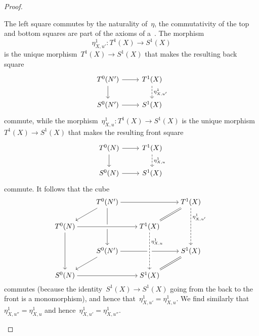 \begin{proof}
\begin{enumerate}
\[      \]
      The left square commutes by the naturality of~$\eta$, the commutativity of the top and bottom squares are part of the axioms of a~{\deltafun}.
      The morphism
      \[
        \eta^1_{X,u'}
        \colon
        T^1(X)
        \to
        S^1(X)
      \]
      is the unique morphism~$T^1(X) \to S^1(X)$ that makes the resulting back square
      \[
        \begin{tikzcd}
            T^0(N')
            \arrow{r}
            \arrow{d}
          & T^1(X)
            \arrow[dashed]{d}{\eta^1_{X,u'}}
          \\
            S^0(N')
            \arrow{r}
          & S^1(X)
        \end{tikzcd}
      \]
      commute, while the morphism~$\eta^1_{X,u} \colon T^1(X) \to S^1(X)$ is the unique morphism~$T^1(X) \to S^1(X)$ that makes the resulting front square
      \[
        \begin{tikzcd}
            T^0(N)
            \arrow{r}
            \arrow{d}
          & T^1(X)
            \arrow[dashed]{d}{\eta^1_{X,u}}
          \\
            S^0(N)
            \arrow{r}
          & S^1(X)
        \end{tikzcd}
      \]
      commute.
      It follows that the cube
      \[
        \begin{tikzcd}[cramped]
            {}
          & T^0(N')
            \arrow{rr}
            \arrow{dd}
            \arrow{dl}
          & {}
          & T^1(X)
            \arrow[equal]{dl}
            \arrow[dashed]{dd}[right, near start]{\eta^1_{X,u'}}
          \\
            T^0(N)
            \arrow{rr}
            \arrow{dd}
          & {}
          & T^1(X)
            \arrow[from=ll, crossing over]
          & {}
          \\
            {}
          & S^0(N')
            \arrow{rr}
            \arrow{dl}
          & {}
          & S^1(X)
            \arrow[equal]{dl}
          \\
            S^0(N)
            \arrow{rr}
          & {}
          & S^1(X)
            \arrow[from=uu, crossing over, dashed, right, "\eta^1_{X,u}", near start]
          & {}
        \end{tikzcd}
      \]
      commutes (because the identity~$S^1(X) \to S^1(X)$ going from the back to the front is a monomorphism), and hence that~$\eta^1_{X,u'} = \eta^1_{X,u}$.
      We find similarly that~$\eta^1_{X,u''} = \eta^1_{X,u}$ and hence~$\eta^1_{X,u'} = \eta^1_{X,u''}$.
      

\end{enumerate}
\end{proof}
